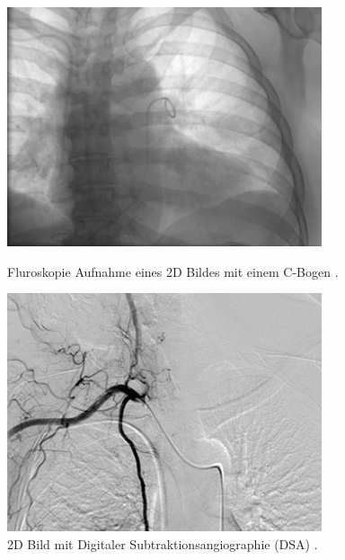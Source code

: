 \begin{figure}[!htb]
	\includegraphics[width=\linewidth]{Content/Pictures/fluroscopy.png}
	\caption{Fluroskopie Aufnahme eines 2D Bildes mit einem C-Bogen \cite{CurrentAndFuture}.}
	\label{fig:fluroscopy}
	\endminipage\hfill
	\includegraphics[width=\linewidth]{Content/Pictures/dsa.png}
	\caption{2D Bild mit Digitaler Subtraktionsangiographie (DSA) \cite{CurrentAndFuture}.}
	\label{fig:dsa}
	\endminipage\hfill

\end{figure}
